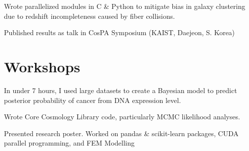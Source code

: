 \documentclass[]{deedy-resume-openfont}
\begin{document}
\begin{minipage}[t]{0.66\textwidth}
 \hfill  {}

\begin{tightemize}
\item Wrote parallelized modules in C \& Python to mitigate bias in galaxy clustering due to redshift incompleteness caused by fiber collisions. \item Published results as talk in CosPA Symposium (KAIST, Daejeon, S. Korea) \end{tightemize}
\sectionsep


\section{\color{Blue} Workshops}
In under 7 hours, I used large datasets to create a Bayesian model to predict posterior probability of cancer from DNA expression level.
\sectionsep

Wrote Core Cosmology Library code, particularly MCMC likelihood analyses.
\sectionsep


Presented research poster. Worked on pandas \& scikit-learn packages, CUDA parallel programming, and FEM Modelling
\sectionsep




\end{minipage} 
\end{document}
